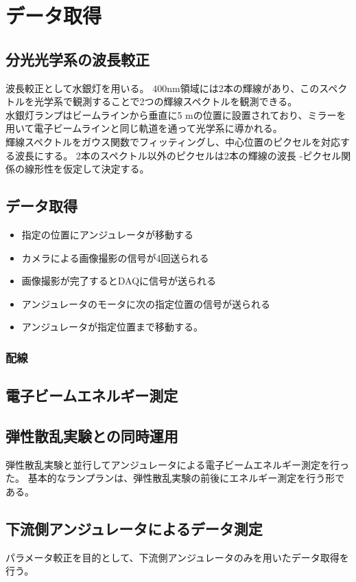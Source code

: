 \documentclass[a4paper,11pt,uplatex]{jsbook}
\begin{document}
\section{データ取得}


\subsection{分光光学系の波長較正}
波長較正として水銀灯を用いる。
$400 \text{nm}$領域には2本の輝線があり、このスペクトルを光学系で観測することで2つの輝線スペクトルを観測できる。\\
水銀灯ランプはビームラインから垂直に5 mの位置に設置されており、ミラーを用いて電子ビームラインと同じ軌道を通って光学系に導かれる。\\

輝線スペクトルをガウス関数でフィッティングし、中心位置のピクセルを対応する波長にする。
2本のスペクトル以外のピクセルは2本の輝線の波長 -ピクセル関係の線形性を仮定して決定する。
\subsection{データ取得}
\begin{itemize}
  \item 指定の位置にアンジュレータが移動する
  \item カメラによる画像撮影の信号が4回送られる
  \item 画像撮影が完了するとDAQに信号が送られる
  \item アンジュレータのモータに次の指定位置の信号が送られる
  \item アンジュレータが指定位置まで移動する。
\end{itemize}
\subsubsection{配線}

\subsection{電子ビームエネルギー測定}

\subsection{弾性散乱実験との同時運用}
弾性散乱実験と並行してアンジュレータによる電子ビームエネルギー測定を行った。
基本的なランプランは、弾性散乱実験の前後にエネルギー測定を行う形である。
\subsection{下流側アンジュレータによるデータ測定}
パラメータ較正を目的として、下流側アンジュレータのみを用いたデータ取得を行う。
\end{document}
